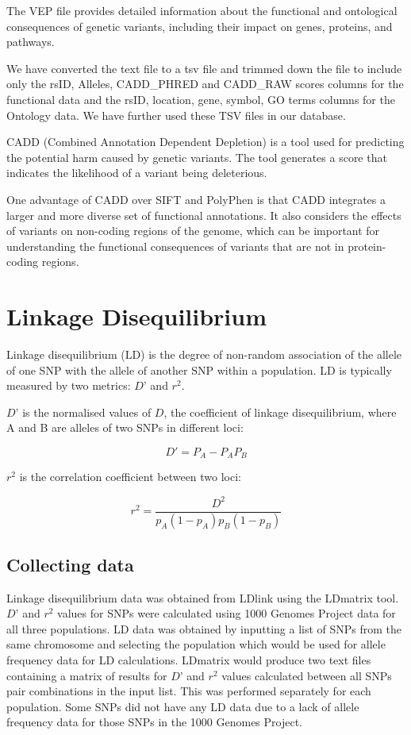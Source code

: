\documentclass[12pt,a4paper]{article}
\newcommand{\sect}[1]{
\clearpage
\hypertarget{#1}{
\section{#1}\label{#1}}
}
\newcommand{\subsect}[1]{
\FloatBarrier %
\hypertarget{#1}{
\subsection{#1}\label{#1}}
}
\begin{document}
The VEP file provides detailed information about the functional and ontological consequences of genetic variants, including their impact on genes, proteins, and pathways.

We have converted the text file to a tsv file and trimmed down the file to include only the rsID, Alleles, CADD\_PHRED and CADD\_RAW scores columns for the functional data and the rsID, location, gene, symbol, GO terms columns for the Ontology data. We have further used these TSV files in our database.

CADD (Combined Annotation Dependent Depletion) is a tool used for predicting the potential harm caused by genetic variants. The tool generates a score that indicates the likelihood of a variant being deleterious.

One advantage of CADD over SIFT and PolyPhen is that CADD integrates a larger and more diverse set of functional annotations. It also considers the effects of variants on non-coding regions of the genome, which can be important for understanding the functional consequences of variants that are not in protein-coding regions.

\sect {Linkage Disequilibrium}

Linkage disequilibrium (LD) is the degree of non-random association of the allele of one SNP with the allele of another SNP within a population. LD is typically measured by two metrics: $D’$ and $r^2$.

$D’$ is the normalised values of $D$, the coefficient of linkage disequilibrium, where A and B are alleles of two SNPs in different loci:

\[D'=P_A -  P_A P_B\]

$r^2$  is the correlation coefficient between two loci:

\[r^2 = \frac{D^2}{p_A(1-p_A)p_B(1-p_B)} \]


\subsect{Collecting data}

Linkage disequilibrium data was obtained from LDlink using the LDmatrix tool. $D’$ and $r^2$ values for SNPs were calculated using 1000 Genomes Project data for all three populations. LD data was obtained by inputting a list of SNPs from the same chromosome and selecting the population which would be used for allele frequency data for LD calculations. LDmatrix would produce two text files containing a matrix of results for $D’$ and $r^2$ values calculated between all SNPs pair combinations in the input list. This was performed separately for each population. Some SNPs did not have any LD data due to a lack of allele frequency data for those SNPs in the 1000 Genomes Project.
\end{document}
